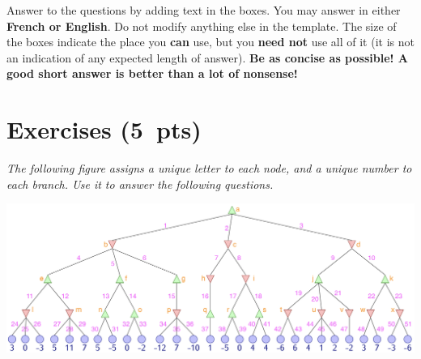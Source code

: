 \documentclass[11pt,a4paper]{report}
\begin{document}
\maketitle

Answer to the questions by adding text in the boxes. You may answer in either \textbf{French or English}. Do not modify anything else in the template.  The size of the boxes indicate the place you \textbf{can} use, but you \textbf{need not} use all of it (it is not an indication of any expected length of answer). \textbf{Be as concise as possible! A good short answer is better than a lot of nonsense!}

\section{Exercises (5~pts)}

\textit{The following figure assigns a unique letter to each node, and a unique number to each branch. Use it to answer the following questions.}
\begin{center}
\includegraphics[width=\linewidth]{images/minimax_labelled.png}
\end{center}
\end{document}

